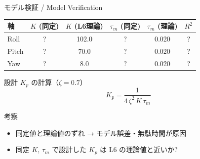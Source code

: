 \begin{frame}{モデル検証 / Model Verification}
  \vspace{-0.3em}

  {\small
  \begin{table}
    \centering
    \begin{tabular}{lccccc}
      \hline
      \textbf{軸} & \textbf{$K$ (同定)} & \textbf{$K$ (L6理論)} & \textbf{$\tau_m$ (同定)} & \textbf{$\tau_m$ (理論)} & \textbf{$R^2$} \\
      \hline
      Roll  & ? & 102.0 & ? & 0.020 & ? \\
      Pitch & ? &  70.0 & ? & 0.020 & ? \\
      Yaw   & ? &  8.0 & ? & 0.020 & ? \\
      \hline
    \end{tabular}
  \end{table}
  }

  \vspace{0.2em}

  \begin{block}{設計 $K_p$ の計算（$\zeta = 0.7$）}
    \vspace{-0.5em}
    \[
      K_p = \frac{1}{4\,\zeta^2\,K\,\tau_m}
    \]
    \vspace{-1em}
  \end{block}

  \vspace{0.2em}

  \begin{exampleblock}{考察}
    {\footnotesize
    \begin{itemize}\setlength{\itemsep}{0pt}
      \item 同定値と理論値のずれ → モデル誤差・無駄時間が原因
      \item 同定 $K$, $\tau_m$ で設計した $K_p$ は L6 の理論値と近いか?
    \end{itemize}
    }
  \end{exampleblock}
\end{frame}

